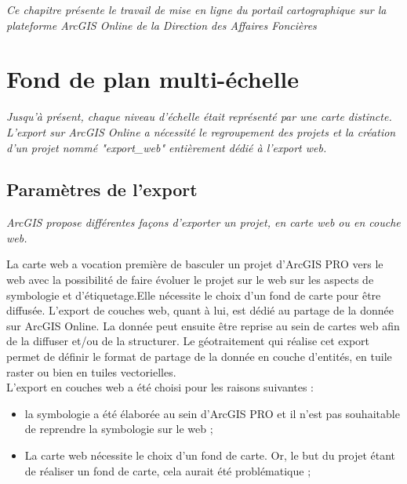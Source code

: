 
\textit{Ce chapitre présente le travail de mise en ligne du portail cartographique sur la plateforme ArcGIS Online de la Direction des Affaires Foncières}

\section{Fond de plan multi-échelle}

\textit{Jusqu'à présent, chaque niveau d'échelle était représenté par une carte distincte. L'export sur ArcGIS Online a nécessité le regroupement des projets et la création d'un projet nommé "export\_web" entièrement dédié à l'export web.}





\subsection{ Paramètres de l'export}

\textit{ArcGIS propose différentes façons d’exporter un projet, en carte web ou en couche web. }

La carte web a vocation première de basculer un projet d’ArcGIS PRO vers le web avec la possibilité de faire évoluer le projet sur le web sur les aspects de symbologie et d’étiquetage.Elle nécessite le choix d’un fond de carte pour être diffusée.  L’export de couches web, quant à lui,  est dédié au partage de la donnée sur ArcGIS Online. La donnée peut ensuite être reprise au sein de cartes web afin de la diffuser et/ou de la structurer. Le géotraitement qui réalise cet export permet de définir le format de partage de la donnée en couche d'entités, en tuile raster ou bien en tuiles vectorielles. \\

L’export en couches web a été choisi pour les raisons suivantes : 

\begin{itemize}
\item la symbologie a été élaborée au sein d’ArcGIS PRO et il n’est pas souhaitable de reprendre la symbologie sur le web ; 
\item  La carte web nécessite le choix d’un fond de carte. Or, le but du projet étant de réaliser un fond de carte, cela aurait été problématique ; \\
\end{itemize}

